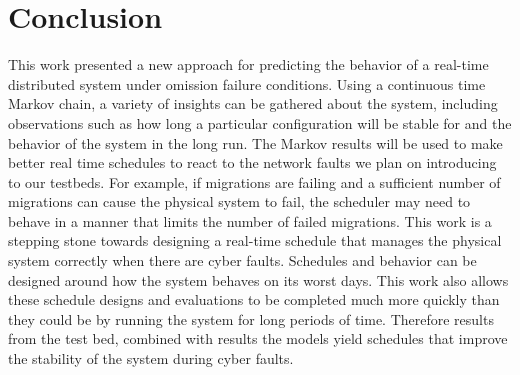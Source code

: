 \section{Conclusion}

This work presented a new approach for predicting the behavior of a real-time distributed system under omission failure conditions.
Using a continuous time Markov chain, a variety of insights can be gathered about the system, including observations such as how long a particular configuration will be stable for and the behavior of the system in the long run. 
The Markov results will be used to make better real time schedules to react to the network faults we plan on introducing to our testbeds.
For example, if migrations are failing and a sufficient number of migrations can cause the physical system to fail, the scheduler may need to behave in a manner that limits the number of failed migrations.
This work is a stepping stone towards designing a real-time schedule that manages the physical system correctly when there are cyber faults.
Schedules and behavior can be designed around how the system behaves on its worst days.
This work also allows these schedule designs and evaluations to be completed much more quickly than they could be by running the system for long periods of time.
Therefore results from the test bed, combined with results the models yield schedules that improve the stability of the system during cyber faults.




